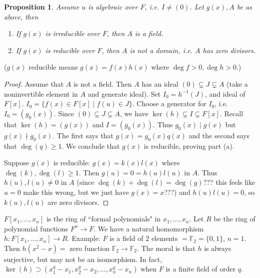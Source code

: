 \documentclass{article}
\theoremstyle{plain}
\newtheorem{proposition}{Proposition}
\theoremstyle{remark}
\begin{document}
\begin{proposition}
	Assume $u$ is algebraic over $F$, i.e. $I \neq (0)$.
	Let $g(x),A$ be as above, then
	\begin{enumerate}
		\item If $g(x)$ is irreducible over $F$, then $A$ is a field.
		\item If $g(x)$ is reducible over $F$, then $A$ is not a domain,
			i.e. $A$ has zero divisors.
	\end{enumerate}
\end{proposition}
($g(x)$ reducible means $g(x) = f(x)h(x)$ where $\deg{f} > 0, \deg{h} > 0$.)
\begin{proof}
	Assume that $A$ is not a field.
	Then $A$ has an ideal $(0) \subsetneq J \subsetneq A$
	(take a noninvertible element in $A$ and generate ideal).
	Set $I_0 = h^{-1}(J)$, and ideal of $F[x]$.
	$I_0 = \{f(x) \in F[x] \mid f(u) \in J\}$.
	Choose a generator for $I_0$, i.e. $I_0 = (g_0(x))$.
	Since $(0) \subsetneq J \subsetneq A$, we have $\ker(h) \subsetneq I \subsetneq F[x]$.
	Recall that $\ker(h) = (g(x))$ and $I = (g_0(x))$.
	Thus $g_0(x) \mid g(x)$ but $g(x) \nmid g_0(x)$.
	The first says that $g(x) = g_0(x)q(x)$ and the second says that $\deg(q)\geq1$.
	We conclude that $g(x)$ is reducible, proving part (a).

	Suppose $g(x)$ is reducible: $g(x) = k(x)l(x)$ where
	$\deg(k),\deg(l) \geq 1$.
	Then $g(u) = 0 = h(u)l(u)$ in $A$.
	Thus $h(u), l(u) \neq 0$ in $A$
	(since $\deg(k) + \deg(l) = \deg(g)$???
	this feels like $u=0$ make this wrong, but we just have $g(x) = x$???)
	and $h(u)l(u) = 0$,
	so $k(u),l(u)$ are zero divisors.
\end{proof}

$F[x_1,\dots,x_n]$ is the ring of ``formal polynomials" in $x_1,\dots,x_n$.
Let $R$ be the ring of polynomial functions $F^n \to F$.
We have a natural homomorphism $h \colon F[x_1,\dots,x_n] \to R$.
Example: $F$ is a field of $2$ elements $ = \mathbb{F}_2 = \{0,1\}$, $n=1$.
Then $h(x^2-x) = $ zero function $\mathbb{F}_2 \to \mathbb{F}_2$.
The moral is that $h$ is always surjective,
but may not be an isomorphism.
In fact, $\ker(h) \supset (x_1^q - x_1, x_2^q-x_2,\dots,x_n^q-x_n)$
when $F$ is a finite field of order $q$.
\end{document}

